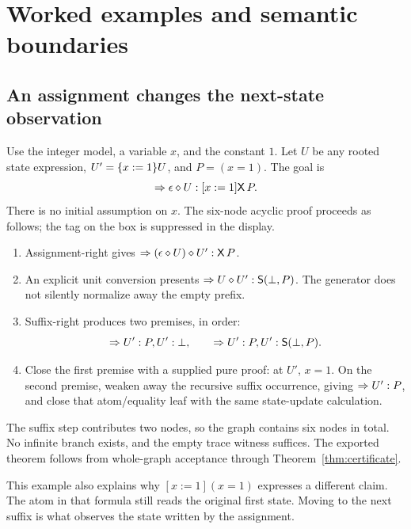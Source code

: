 \section{Worked examples and semantic boundaries}\label{sec:examples}

\subsection{An assignment changes the next-state observation}
Use the integer model, a variable $x$, and the constant $1$. Let $U$ be any
rooted state expression, $U'=\{x:=1\}U$, and $P=(x=1)$. The goal is
\[
 \Rightarrow \epsilon\mathbin{\diamond} U:[x:=1]\mathsf{X}\,P.
\]
There is no initial assumption on $x$. The six-node acyclic proof proceeds
as follows; the tag on the box is suppressed in the display.
\begin{enumerate}
\item Assignment-right gives
$\Rightarrow (\epsilon\mathbin{\diamond} U)\mathbin{\diamond} U':\mathsf{X}\,P$.
\item An explicit unit conversion presents
$\Rightarrow U\mathbin{\diamond} U':\mathsf{S}(\bot,P)$.
The generator does not silently normalize away the empty prefix.
\item Suffix-right produces two premises, in order:
\[
 \Rightarrow U':P,U':\bot,\qquad
 \Rightarrow U':P,U':\mathsf{S}(\bot,P).
\]
\item Close the first premise with a supplied pure proof: at $U'$, $x=1$.
On the second premise, weaken away the recursive suffix occurrence, giving
$\Rightarrow U':P$, and close that atom/equality leaf with the same
state-update calculation.
\end{enumerate}
The suffix step contributes two nodes, so the graph contains six nodes in
total. No infinite branch exists, and the empty trace witness suffices. The
exported theorem follows from whole-graph acceptance through
Theorem~\ref{thm:certificate}.

This example also explains why $[x:=1](x=1)$ expresses a different claim.
The atom in that formula still reads the original first state. Moving to
the next suffix is what observes the state written by the assignment.

